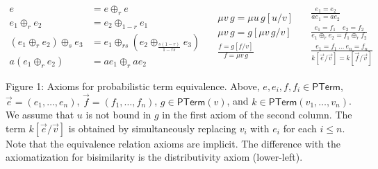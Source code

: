 \documentclass[11pt,a4paper]{amsart}
\begin{document}
\begin{center}
\hypertarget{html:S8.EGx3}{} %
\hypertarget{html:S3.Ex10}{}  %
\hypertarget{html:S3.Ex10.m1}{}\[\displaystyle
\begin{aligned}
e&=e\oplus_r e\\
e_1\oplus_r e_2&=e_2\oplus_{1-r}e_1\\
(e_1\oplus_r e_2)\oplus_s e_3&=e_1\oplus_{rs}(e_2\oplus_{\frac{s(1-r)}{1-rs}}e_3)\\
a(e_1\oplus_r e_2)&=ae_1\oplus_r ae_2
\end{aligned}
\quad
\begin{gathered}
\mu v\,g=\mu u\,g[u/v]\\
\mu v\,g=g[\mu v\,g/v]\\
\frac{f=g[f/v]}{f=\mu v\,g}
\end{gathered}
\quad
\begin{gathered}
\frac{e_1=e_2}{ae_1=ae_2}\\[3pt]
\frac{e_1=f_1\quad e_2=f_2}{e_1\oplus_r e_2=f_1\oplus_r f_2}\\[3pt]
\frac{e_1=f_1\ \dots\ e_n=f_n}{k[\vec e/\vec v]=k[\vec f/\vec v]}
\end{gathered}
\]    
\par\smallskip Figure 1: Axioms for probabilistic term equivalence. Above, %
\hypertarget{html:S3.F1.m12}{}\({e,e_{i},f,f_{i}\in\mathsf{PTerm}}\), %
\hypertarget{html:S3.F1.m13}{}\({\vec{e}=(e_{1},\dots,e_{n})}\), %
\hypertarget{html:S3.F1.m14}{}\({\vec{f}=(f_{1},\dots,f_{n})}\), %
\hypertarget{html:S3.F1.m15}{}\({g\in\mathsf{PTerm}(v)}\), and %
\hypertarget{html:S3.F1.m16}{}\({k\in\mathsf{PTerm}(v_{1},\dots,v_{n})}\). We assume that %
\hypertarget{html:S3.F1.m17}{}\({u}\) is not bound in %
\hypertarget{html:S3.F1.m18}{}\({g}\) in the first axiom of the second column. The term %
\hypertarget{html:S3.F1.m19}{}\({k[\vec{e}/\vec{v}]}\) is obtained by simultaneously replacing %
\hypertarget{html:S3.F1.m20}{}\({v_{i}}\) with %
\hypertarget{html:S3.F1.m21}{}\({e_{i}}\) for each %
\hypertarget{html:S3.F1.m22}{}\({i\leq n}\). Note that the equivalence relation axioms are implicit. The difference with the axiomatization for bisimilarity is the distributivity axiom (lower-left).
\par\medskip
 
\end{center}
\end{document}
